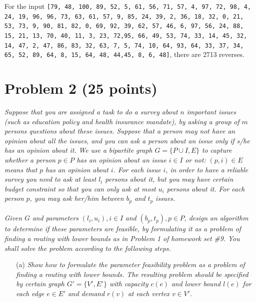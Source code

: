 \documentclass[12pt]{article}
\begin{document}
{\begin{enumerate}
For the input \texttt{[79, 48, 100, 89, 52, 5, 61, 56, 71, 57, 4, 97, 72, 98, 4, 24, 19, 96, 96, 73, 63, 61, 57, 9, 85, 24, 39, 2, 36, 18, 32, 0, 21, 53, 73, 9, 90, 81, 82, 0, 69, 92, 39, 62, 57, 46, 6, 97, 56, 24, 88, 15, 21, 13, 70, 40, 11, 3, 23, 72,95, 66, 49, 53, 74, 33, 14, 45, 32, 14, 47, 2, 47, 86, 83, 32, 63, 7, 5, 74, 10, 64, 93, 64, 33, 37, 34, 65, 52, 89, 64, 8, 15, 64, 48, 44,45, 8, 6, 48]}, there are 2713 reverses.
\end{enumerate}

\newpage
\section*{{\selectfont Problem 2 (25 points)}}\vspace{-10mm}
\textsl{Suppose that you are assigned a task to do a survey about $n$ important issues (such as education policy and health insurance mandate), by asking a group of $m$ persons questions about these issues. Suppose that a person may not have an opinion about all the issues, and you can ask a person about an issue only if s/he has an opinion about it. We use a bipartite graph $G = \{P \cup I, E\}$ to capture whether a person $p \in P$ has an opinion about an issue $i \in I$ or not: $(p, i) \in E$ means that $p$ has an opinion about $i$. For each issue $i$, in order to have a reliable survey you need to ask at least $l_i$ persons about it, but you may have certain budget constraint so that you can only ask at most $u_i$ persons about it. For each person $p$, you may ask her/him between $b_p$ and $t_p$ issues.}\\ \\
\textsl{Given $G$ and parameters $(l_i, u_i), i \in I$ and $(b_p, t_p), p \in P$, design an algorithm to determine if these parameters are feasible, by formulating it as a problem of finding a routing with lower bounds as in Problem 1 of homework set \#9. You shall solve the problem according to the following steps.}
\begin{enumerate}
\item[(a)]\textsl{Show how to formulate the parameter feasibility problem as a problem of finding a routing with lower bounds. The resulting problem should be specified by certain graph $G' = \{V', E'\}$ with capacity $c(e)$ and lower bound $l(e)$ for each edge $e \in E'$ and demand $r(v)$ at each vertex $v \in V'$.}\\ \\

\end{enumerate}}
\end{document}
